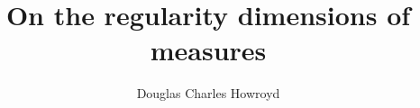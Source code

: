 \documentclass[a4paper]{report}
\title{On the regularity dimensions of measures}
\author{Douglas Charles Howroyd}
\theoremstyle{definition}
\begin{document}
 \null \newpage
 


\onehalfspacing



\singlespacing
\tableofcontents
\onehalfspacing

\begin{large}










\end{large}


\singlespacing
\printnomenclature
\clearpage
{}
\onehalfspacing

\singlespacing

%




\begin{large}
 
\end{large}
\end{document}
